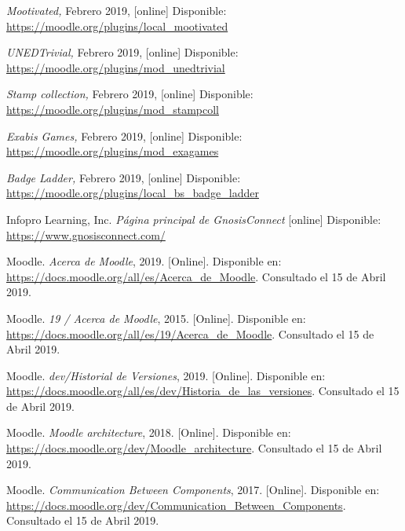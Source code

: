 \begin{thebibliography}{9}
        \textit{Mootivated,}
        Febrero 2019, [online] Disponible:
        \url{https://moodle.org/plugins/local_mootivated}

        \textit{UNEDTrivial,}
        Febrero 2019, [online] Disponible:
        \url{https://moodle.org/plugins/mod_unedtrivial}

        \textit{Stamp collection,}
        Febrero 2019, [online] Disponible:
        \url{https://moodle.org/plugins/mod_stampcoll}

        \textit{Exabis Games,}
        Febrero 2019, [online] Disponible:
        \url{https://moodle.org/plugins/mod_exagames}

        \textit{Badge Ladder,}
        Febrero 2019, [online] Disponible:
        \url{https://moodle.org/plugins/local_bs_badge_ladder}

    Infopro Learning, Inc. \textit{Página principal de GnosisConnect} [online] Disponible:
    \url{https://www.gnosisconnect.com/}


        Moodle. {\it Acerca de Moodle}, 2019. [Online]. Disponible en:
        \url{https://docs.moodle.org/all/es/Acerca_de_Moodle}. Consultado el 15 de Abril 2019.

        Moodle. {\it 19 / Acerca de Moodle}, 2015. [Online]. Disponible en:
        \url{https://docs.moodle.org/all/es/19/Acerca_de_Moodle}. Consultado el 15 de Abril 2019.

        Moodle. {\it dev/Historial de Versiones}, 2019. [Online]. Disponible en:
        \url{https://docs.moodle.org/all/es/dev/Historia_de_las_versiones}. Consultado el 15 de Abril 2019.

        Moodle. {\it Moodle architecture}, 2018. [Online]. Disponible en:
        \url{https://docs.moodle.org/dev/Moodle_architecture}. Consultado el 15 de Abril 2019.

        Moodle. {\it Communication Between Components}, 2017. [Online]. Disponible en:
        \url{https://docs.moodle.org/dev/Communication_Between_Components}. Consultado el 15 de Abril 2019.


\end{thebibliography}
